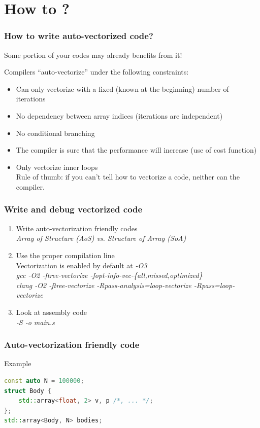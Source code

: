 \documentclass{beamer}
\begin{document}
\section{How to ?}

\begin{frame}
\frametitle{How to write auto-vectorized code?}
Some portion of your codes may already benefits from it!

Compilers ``auto-vectorize'' under the following constraints:

\begin{itemize}
    \item<1-> Can only vectorize  with a fixed (known at the beginning) number of iterations
    \item<2-> No dependency between array indices (iterations are independent)
    \item<3-> No conditional branching
    \item<4-> The compiler is sure that the performance will increase (use of cost function)
    \item<5-> Only vectorize inner loops\\
    \vspace{0.5cm}
    Rule of thumb: if you can't tell how to vectorize a code, neither can the compiler.
\end{itemize}
\end{frame}

\begin{frame}
\frametitle{Write and debug vectorized code}
\begin{enumerate}
    \item Write auto-vectorization friendly codes \\
    \textit{ Array of Structure (AoS) vs. Structure of Array (SoA) }
    
    \item Use the proper compilation line \\
    Vectorization is enabled by default at \textit{-O3}\\
    \textit{gcc -O2 -ftree-vectorize -fopt-info-vec-\{all,missed,optimized\} }\\
    \textit{clang -O2 -ftree-vectorize -Rpass-analysis=loop-vectorize -Rpass=loop-vectorize}
    
    \item Look at assembly code  \\
    \textit{-S -o main.s}
    
\end{enumerate}
\end{frame}
\begin{frame}[fragile]
\frametitle{Auto-vectorization friendly code}
\begin{block}{Example}
\begin{lstlisting}[language=C++, caption={AoS}]
const auto N = 100000;
struct Body {
    std::array<float, 2> v, p /*, ... */;
};
std::array<Body, N> bodies;
\end{lstlisting}
\end{block}
\end{frame}
\end{document}

